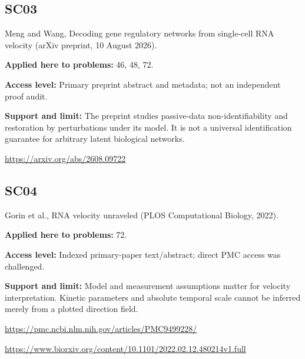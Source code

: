 \documentclass[11pt]{article}
\begin{document}
\subsection*{SC03}\label{check:SC03}

Meng and Wang, Decoding gene regulatory networks from single-cell RNA velocity (arXiv preprint, 10 August 2026).

\textbf{Applied here to problems:} 46, 48, 72.

\textbf{Access level:} Primary preprint abstract and metadata; not an independent proof audit.

\textbf{Support and limit:} The preprint studies passive-data non-identifiability and restoration by perturbations under its model. It is not a universal identification guarantee for arbitrary latent biological networks.

\url{https://arxiv.org/abs/2608.09722}

\subsection*{SC04}\label{check:SC04}

Gorin et al., RNA velocity unraveled (PLOS Computational Biology, 2022).

\textbf{Applied here to problems:} 72.

\textbf{Access level:} Indexed primary-paper text/abstract; direct PMC access was challenged.

\textbf{Support and limit:} Model and measurement assumptions matter for velocity interpretation. Kinetic parameters and absolute temporal scale cannot be inferred merely from a plotted direction field.

\url{https://pmc.ncbi.nlm.nih.gov/articles/PMC9499228/}

\url{https://www.biorxiv.org/content/10.1101/2022.02.12.480214v1.full}
\end{document}
